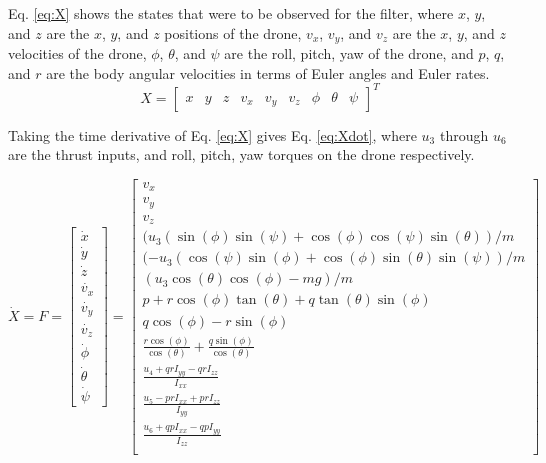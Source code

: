 \documentclass[letterpaper, preprint, paper,11pt]{AAS}	%
\begin{document}
Eq. \eqref{eq:X} shows the states that were to be observed for the filter, where $x$, $y$, and $z$ are the $x$, $y$, and $z$ positions of the drone, $v_x$, $v_y$, and $v_z$ are the $x$, $y$, and $z$ velocities of the drone, $\phi$, $\theta$, and $\psi$ are the roll, pitch, yaw of the drone, and $p$, $q$, and $r$ are the body angular velocities in terms of Euler angles and Euler rates. 
\begin{equation}
	\label{eq:X}
	X = \begin{bmatrix}
		x & y & z & v_x & v_y & v_z & \phi & \theta & \psi
\end{bmatrix}^T
\end{equation}

Taking the time derivative of Eq. \eqref{eq:X} gives Eq. \eqref{eq:Xdot}, where $u_3$ through $u_6$ are the thrust inputs, and roll, pitch, yaw torques on the drone respectively.

\begin{equation}
	\label{eq:Xdot}
	\dot{X} = F = \begin{bmatrix}
		\dot{x} \\ \dot{y} \\ \dot{z} \\ \dot{v_x} \\ \dot{v_y} \\ \dot{v_z} \\ \dot{\phi} \\ \dot{\theta} \\ \dot{\psi}
\end{bmatrix} =  \begin{bmatrix}
v_x \\
v_y \\
v_z \\
(u_3(\sin(\phi)\sin(\psi) + \cos(\phi)\cos(\psi)\sin(\theta))/m \\
(-u_3(\cos(\psi)\sin(\phi) + \cos(\phi)\sin(\theta)\sin(\psi))/m \\
(u_3\cos(\theta)\cos(\phi) - mg)/m \\
p + r\cos(\phi)\tan(\theta) + q\tan(\theta)\sin(\phi) \\
q\cos(\phi) - r\sin(\phi) \\
\frac{r\cos(\phi)}{\cos(\theta)} + \frac{q\sin(\phi)}{\cos(\theta)} \\
\frac{u_4 + qrI_{yy} - qrI_{zz}}{I_{xx}} \\
\frac{u_5 - prI_{xx} + prI_{zz}}{I_{yy}} \\
\frac{u_6 + qpI_{xx} - qpI_{yy}}{I_{zz}} \\
\end{bmatrix}
\end{equation}
\end{document}
